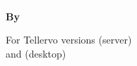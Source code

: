 \begin{titlepage}
\AddToShipoutPicture*{\BackgroundPic}




\includegraphics{Images/pixel.png}\\[187mm] 
{
\raggedleft
\Large \textbf{By \authornames}\\
}

\vfill
{
\large For Tellervo versions {\serverversionnumber} (server)\\
and {\desktopversionnumber} (desktop)\\[4mm]
}



\end{titlepage}